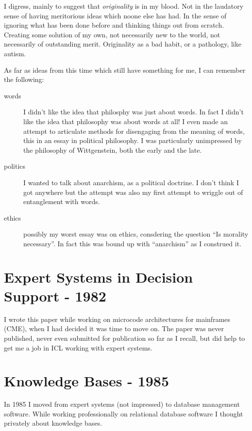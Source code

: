 \documentclass[10pt,titlepage]{book}
\begin{document}
I digress, mainly to suggest that {\it originality} is in my blood.
Not in the laudatory sense of having meritorious ideas which noone else has had.
In the sense of ignoring what has been done before and thinking things out from scratch.
Creating some solution of my own, not necessarily new to the world, not necessarily of outstanding merit.
Originality as a bad habit, or a pathology, like autism.

As far as ideas from this time which still have something for me, I can remember the following:

\begin{description}
\item[words] I didn't like the idea that philosphy was just about words.
In fact I didn't like the idea that philosophy was about words at all!
I even made an attempt to articulate methods for disengaging from the meaning of words, this in an essay in political philosophy.
I was particularly unimpressed by the philosophy of Wittgenstein, both the early and the late.
\item[politics] I wanted to talk about anarchism, as a political doctrine.  I don't think I got anywhere but the attempt was also my first attempt to wriggle out of entanglement with words.
\item[ethics] possibly my worst essay was on ethics, consdering the question ``Is morality necessary''.
In fact this was bound up with ``anarchism'' as I construed it.
\end{description}

\section{Expert Systems in Decision Support - 1982}\label{1982}

I wrote this paper while working on microcode architectures for mainframes (CME), when I had decided it was time to move on.
The paper was never published, never even submitted for publication so far as I recall, but did help to get me a job in ICL working with expert systems.

\section{Knowledge Bases - 1985}

In 1985 I moved from expert systems (not impressed) to database management software.
While working professionally on relational database software I thought privately about knowledge bases.
\end{document}
